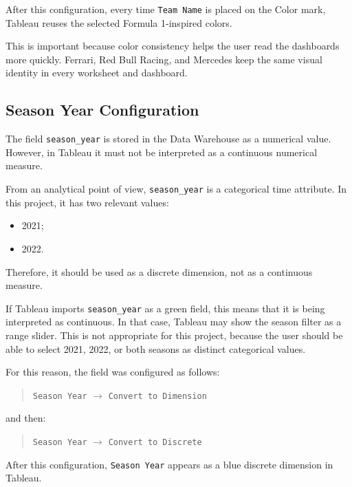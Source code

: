 \documentclass[12pt,a4paper]{article}
\begin{document}
	After this configuration, every time \texttt{Team Name} is placed on the Color mark, Tableau reuses the selected Formula 1-inspired colors.
	
	This is important because color consistency helps the user read the dashboards more quickly.
	Ferrari, Red Bull Racing, and Mercedes keep the same visual identity in every worksheet and dashboard.
	
	
	\subsection{Season Year Configuration}
	
	The field \texttt{season\_year} is stored in the Data Warehouse as a numerical value.
	However, in Tableau it must not be interpreted as a continuous numerical measure.
	
	From an analytical point of view, \texttt{season\_year} is a categorical time attribute.
	In this project, it has two relevant values:
	
	\begin{itemize}[leftmargin=1.2cm]
		\item 2021;
		\item 2022.
	\end{itemize}
	
	Therefore, it should be used as a discrete dimension, not as a continuous measure.
	
	If Tableau imports \texttt{season\_year} as a green field, this means that it is being interpreted as continuous.
	In that case, Tableau may show the season filter as a range slider.
	This is not appropriate for this project, because the user should be able to select 2021, 2022, or both seasons as distinct categorical values.
	
	For this reason, the field was configured as follows:
	
	\begin{quote}
		\texttt{Season Year} $\rightarrow$ \texttt{Convert to Dimension}
	\end{quote}
	
	and then:
	
	\begin{quote}
		\texttt{Season Year} $\rightarrow$ \texttt{Convert to Discrete}
	\end{quote}
	
	After this configuration, \texttt{Season Year} appears as a blue discrete dimension in Tableau.
	
\end{document}
